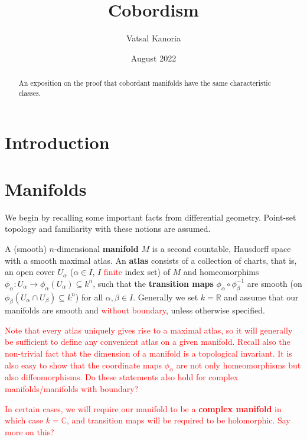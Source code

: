 \documentclass[a4paper]{article}
\theoremstyle{definition} \newtheorem*{definition}{Definition}
\theoremstyle{definition} \newtheorem*{definitions}{Definitions}
\theoremstyle{plain} \newtheorem{theorem}{Theorem}[section]
\theoremstyle{plain} \newtheorem{proposition}[theorem]{Proposition}
\theoremstyle{plain} \newtheorem{corollary}[theorem]{Corollary}
\theoremstyle{plain} \newtheorem{lemma}[theorem]{Lemma}
\theoremstyle{plain} \newtheorem{example}[theorem]{Example}
\newcommand{\checkCorrect}[1]{\textcolor{red}{#1}}
\newcommand{\understandBetter}[1]{\textcolor{red}{#1}}
\newcommand{\question}[1]{\textcolor{red}{#1}}
\newcommand{\explainFurther}[1]{\textcolor{red}{#1}}
\newcommand{\defn}[1]{\textbf{#1}}
\newcommand{\realnos}{\mathbb{R}}
\newcommand{\complexnos}{\mathbb{C}}
\begin{document}
\title{Cobordism}
\author{Vatsal Kanoria}
\date{August 2022}
\maketitle
\begin{abstract}
An exposition on the proof that cobordant manifolds have the same characteristic classes.
\end{abstract}
\tableofcontents

\section{Introduction}


\section{Manifolds}

We begin by recalling some important facts from differential geometry. Point-set topology and familiarity with these notions are assumed.

A (smooth) $n$-dimensional \defn{manifold} $M$ is a second countable, Hausdorff space with a smooth maximal atlas. An \defn{atlas} consists of a collection of charts, that is, an open cover $U_\alpha$ ($\alpha\in I$, $I$ \checkCorrect{finite} index set) of $M$ and homeomorphims $\phi_\alpha:U_\alpha \to \phi_\alpha(U_\alpha) \subseteq k^n$, such that the \defn{transition maps} $\phi_\alpha \circ \phi_\beta^{-1}$ are smooth (on $\phi_\beta(U_\alpha \cap U_\beta)\subseteq k^n$) for all $\alpha, \beta\in I$. Generally we set $k=\realnos$ and assume that our manifolds are smooth and \checkCorrect{without boundary}, unless otherwise specified. 

\understandBetter{Note that every atlas uniquely gives rise to a maximal atlas, so it will generally be sufficient to define any convenient atlas on a given manifold. Recall also the non-trivial fact that the dimension of a manifold is a \explainFurther{topological invariant}. It is also easy to show that the coordinate maps $\phi_\alpha$ are not only homeomorphisms but also diffeomorphisms.} \question{Do these statements also hold for complex manifolds/manifolds with boundary?}

\understandBetter{In certain cases, we will require our manifold to be a \defn{complex manifold} in which case $k=\complexnos$, and transition maps will be required to be \understandBetter{holomorphic}.}
\explainFurther{Say more on this?}
\end{document}
